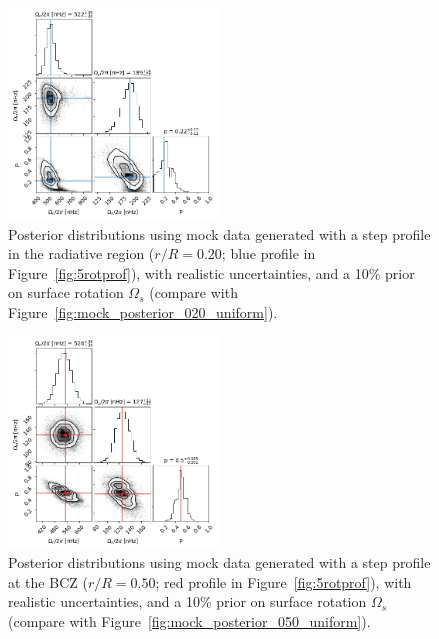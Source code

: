 \begin{figure}[h]
\centering
    \includegraphics[width=0.5\textwidth]{Figures/subgiant_chapter_figures/20.2_corner.png}
    \caption{Posterior distributions using mock data generated with a step profile in the radiative region ($r/R = 0.20$; blue profile in Figure~\ref{fig:5rotprof}), with realistic uncertainties, and a 10\% prior on surface rotation $\Omega_s$ (compare with Figure~\ref{fig:mock_posterior_020_uniform}).}
    \label{fig:mock_posterior_020_reject}
\end{figure}

\begin{figure}[h]
\centering
    \includegraphics[width=0.5\textwidth]{Figures/subgiant_chapter_figures/20.5_corner.png}
    \caption{Posterior distributions using mock data generated with a step profile at the BCZ ($r/R = 0.50$; red profile in Figure~\ref{fig:5rotprof}), with realistic uncertainties, and a 10\% prior on surface rotation $\Omega_s$ (compare with Figure~\ref{fig:mock_posterior_050_uniform}).}
    \label{fig:mock_posterior_050_reject}
\end{figure}



